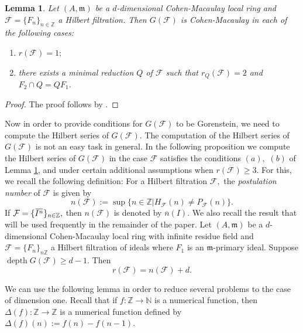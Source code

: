 \documentclass[12pt]{amsart}
\newtheorem{lem}[thm]{Lemma}
\theoremstyle{definition}
\theoremstyle{remark}
\numberwithin{equation}{section}
\newcommand{\bbZ}{\ensuremath{\mathbb Z}}
\newcommand{\m}{{\mathfrak m}}
\DeclareMathOperator{\depth}{depth}
\newcommand{\FF}{\mathcal{F}}
\newcommand{\ol}[1]{\mkern 1.5mu\overline{\mkern-1.5mu#1\mkern-1.5mu}\mkern 1.5mu} %
\begin{document}
\begin{lem}
\label{lemma:GFCM}
 Let $(A, \m) $ be a $d$-dimensional Cohen-Macaulay local ring and $\FF=\{F_n\}_{n\in \mathbb{Z}}$ a Hilbert filtration. Then $G(\FF)$ is Cohen-Macaulay in each of the following cases:
 \begin{enumerate}
  \item $r(\FF)=1;$
  \item  there exists a minimal reduction $Q$ of $\FF$ such that $r_Q(\FF)=2$ and $F_2 \cap Q = QF_1$.
 \end{enumerate}
\end{lem}
\begin{proof}
The proof follows by \cite[Proposition 3.5]{HucMar}.
\end{proof}
\par 
Now in order to provide conditions for $G(\FF)$ to be Gorenstein, we need to compute the Hilbert series of $G(\FF)$. 
The computation of the Hilbert series of $G(\FF)$ is not an easy task in general.
In the following proposition we compute the Hilbert series of $G(\FF)$ 
in the case $\FF$ satisfies the conditions $(a),$ $(b)$ of 
Lemma \ref{lemma:GFCM}, and under certain additional assumptions 
when $r(\FF) \geq 3.$
For this, we recall the following definition: 
For a Hilbert filtration $\FF,$ the \textit{postulation number} 
of $\FF$ is given by 
\[
n(\FF):=\sup\{n\in \mathbb{Z}|H_{\FF}(n)\neq P_{\FF}(n)\}.
\]
If $\FF=\{\ol{I^n}\}_{n\in \bbZ},$ then $n(\FF)$ is denoted by $\overline{n}(I)$. 
We also recall the result \cite[Corollary 3.8]{Mar89} that will be used frequently in the remainder of the paper.  
Let $(A, \m)$ be a $d$-dimensional Cohen-Macaulay local ring with infinite residue field and $\mathcal{F} = \{F_n\}_{n \bbZ}$ a Hilbert filtration of ideals where $F_1$ is an $\m$-primary ideal. 
Suppose $\depth G(\mathcal{F}) \geq d-1$. Then
\begin{equation}\label{redandpos}
  r({\mathcal{F}}) = n(\mathcal{F}) +d.
\end{equation}
\par 
We can use the following lemma in order to reduce several problems to the case of dimension one. 
Recall that if $f:\bbZ \to \mathbb{N}$ is a numerical function, 
then $\Delta(f):\bbZ \to \bbZ$ is a numerical function defined by $\Delta(f)(n):=f(n)-f(n-1)$. 
\end{document}
